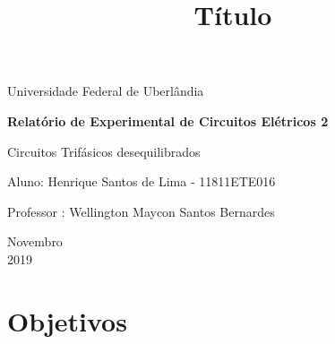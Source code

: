 \documentclass[a4paper, 12pt]{article}
\begin{document}
\begin{titlepage}
	\begin{center}


		\Huge{Universidade Federal de Uberlândia}\\
	\vspace{15pt}

        \vspace{85pt}

		\textbf{\LARGE{Relatório de Experimental de Circuitos Elétricos 2}}
		\title{\large{Título}}

	\end{center}
\vspace{1,5cm}

\begin{flushright}
\begin{list}{}{
    \setlength{\leftmargin}{4.5cm}
    \setlength{\rightmargin}{0cm}
    \setlength{\labelwidth}{0pt}
    \setlength{\labelsep}{\leftmargin}}

    \item
    Circuitos Trifásicos desequilibrados
    \begin{list}{}{
    \setlength{\leftmargin}{0cm}
    \setlength{\rightmargin}{0cm}
    \setlength{\labelwidth}{0pt}
    \setlength{\labelsep}{\leftmargin}}
    \item Aluno:  Henrique Santos de Lima - 11811ETE016\
    \item Professor : Wellington Maycon Santos Bernardes\
\end{list}
   \end{list}
\end{flushright}
\vspace{1cm}
\begin{center}
		\vspace{\fill}
			 Novembro\\
		 2019
			\end{center}
\end{titlepage}

\tableofcontents

\thispagestyle{empty}

\newpage
\section{Objetivos}
\end{document}
